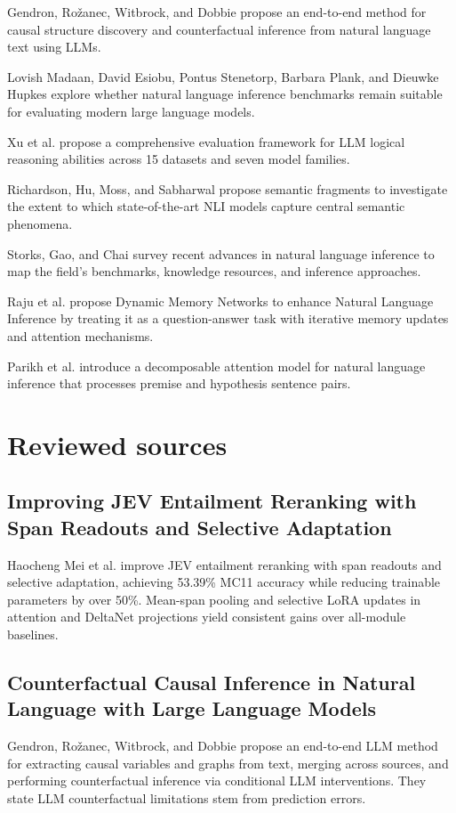 \documentclass{article}\usepackage{amsmath,amssymb,graphicx,url}
\begin{document}
Gendron, Rožanec, Witbrock, and Dobbie propose an end-to-end method for causal structure discovery and counterfactual inference from natural language text using LLMs. \cite{gendron2024counterfactual}

Lovish Madaan, David Esiobu, Pontus Stenetorp, Barbara Plank, and Dieuwke Hupkes explore whether natural language inference benchmarks remain suitable for evaluating modern large language models. \cite{madaan2024lost}

Xu et al. propose a comprehensive evaluation framework for LLM logical reasoning abilities across 15 datasets and seven model families. \cite{xu2023large}

Richardson, Hu, Moss, and Sabharwal propose semantic fragments to investigate the extent to which state-of-the-art NLI models capture central semantic phenomena. \cite{richardson2020probing}

Storks, Gao, and Chai survey recent advances in natural language inference to map the field's benchmarks, knowledge resources, and inference approaches. \cite{storks2019recent}

Raju et al. propose Dynamic Memory Networks to enhance Natural Language Inference by treating it as a question-answer task with iterative memory updates and attention mechanisms. \cite{raju2017dynamic}

Parikh et al. introduce a decomposable attention model for natural language inference that processes premise and hypothesis sentence pairs. \cite{parikh2016decomposable}

\section{Reviewed sources}
\subsection{Improving JEV Entailment Reranking with Span Readouts and Selective Adaptation}
Haocheng Mei et al. improve JEV entailment reranking with span readouts and selective adaptation, achieving 53.39\% MC11 accuracy while reducing trainable parameters by over 50\%. Mean-span pooling and selective LoRA updates in attention and DeltaNet projections yield consistent gains over all-module baselines. \cite{mei2026improving}

\subsection{Counterfactual Causal Inference in Natural Language with Large Language Models}
Gendron, Rožanec, Witbrock, and Dobbie propose an end-to-end LLM method for extracting causal variables and graphs from text, merging across sources, and performing counterfactual inference via conditional LLM interventions. They state LLM counterfactual limitations stem from prediction errors. \cite{gendron2024counterfactual}
\end{document}
